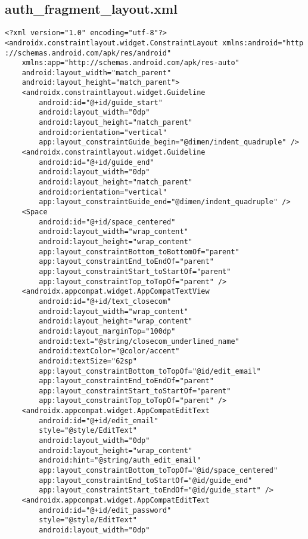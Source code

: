 \documentclass[listing]{espd}
\begin{document}
\subsection{auth\_fragment\_layout.xml}
\begin{verbatim}
<?xml version="1.0" encoding="utf-8"?>
<androidx.constraintlayout.widget.ConstraintLayout xmlns:android="http
://schemas.android.com/apk/res/android"
    xmlns:app="http://schemas.android.com/apk/res-auto"
    android:layout_width="match_parent"
    android:layout_height="match_parent">
    <androidx.constraintlayout.widget.Guideline
        android:id="@+id/guide_start"
        android:layout_width="0dp"
        android:layout_height="match_parent"
        android:orientation="vertical"
        app:layout_constraintGuide_begin="@dimen/indent_quadruple" />
    <androidx.constraintlayout.widget.Guideline
        android:id="@+id/guide_end"
        android:layout_width="0dp"
        android:layout_height="match_parent"
        android:orientation="vertical"
        app:layout_constraintGuide_end="@dimen/indent_quadruple" />
    <Space
        android:id="@+id/space_centered"
        android:layout_width="wrap_content"
        android:layout_height="wrap_content"
        app:layout_constraintBottom_toBottomOf="parent"
        app:layout_constraintEnd_toEndOf="parent"
        app:layout_constraintStart_toStartOf="parent"
        app:layout_constraintTop_toTopOf="parent" />
    <androidx.appcompat.widget.AppCompatTextView
        android:id="@+id/text_closecom"
        android:layout_width="wrap_content"
        android:layout_height="wrap_content"
        android:layout_marginTop="100dp"
        android:text="@string/closecom_underlined_name"
        android:textColor="@color/accent"
        android:textSize="62sp"
        app:layout_constraintBottom_toTopOf="@id/edit_email"
        app:layout_constraintEnd_toEndOf="parent"
        app:layout_constraintStart_toStartOf="parent"
        app:layout_constraintTop_toTopOf="parent" />
    <androidx.appcompat.widget.AppCompatEditText
        android:id="@+id/edit_email"
        style="@style/EditText"
        android:layout_width="0dp"
        android:layout_height="wrap_content"
        android:hint="@string/auth_edit_email"
        app:layout_constraintBottom_toTopOf="@id/space_centered"
        app:layout_constraintEnd_toStartOf="@id/guide_end"
        app:layout_constraintStart_toEndOf="@id/guide_start" />
    <androidx.appcompat.widget.AppCompatEditText
        android:id="@+id/edit_password"
        style="@style/EditText"
        android:layout_width="0dp"

\end{verbatim}
\end{document}
